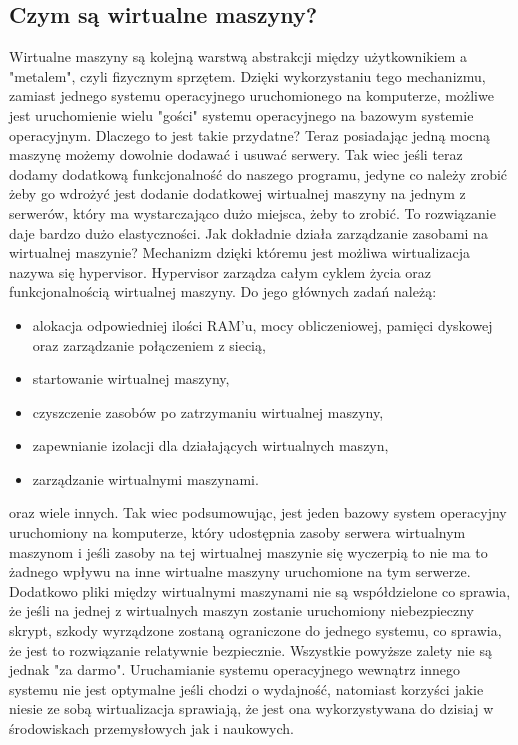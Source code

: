\subsection{Czym są wirtualne maszyny?}
Wirtualne maszyny są kolejną warstwą abstrakcji między użytkownikiem a "metalem", czyli fizycznym sprzętem. Dzięki wykorzystaniu tego mechanizmu, zamiast jednego systemu operacyjnego uruchomionego na komputerze, możliwe jest uruchomienie wielu "gości" systemu operacyjnego na bazowym systemie operacyjnym. Dlaczego to jest takie przydatne? Teraz posiadając jedną mocną maszynę możemy dowolnie dodawać i usuwać serwery. Tak wiec jeśli  teraz dodamy dodatkową funkcjonalność do naszego programu, jedyne co należy zrobić żeby go wdrożyć jest dodanie dodatkowej wirtualnej maszyny na jednym z serwerów, który ma wystarczająco dużo miejsca, żeby to zrobić. To rozwiązanie daje bardzo dużo elastyczności. 
Jak dokładnie działa zarządzanie zasobami na wirtualnej maszynie?
Mechanizm dzięki któremu jest możliwa wirtualizacja nazywa się hypervisor. Hypervisor zarządza całym cyklem życia oraz funkcjonalnością wirtualnej maszyny. 
Do jego głównych zadań należą:
\begin{itemize}
    \item alokacja odpowiedniej ilości RAM'u, mocy obliczeniowej, pamięci dyskowej oraz zarządzanie połączeniem z siecią,
    \item startowanie wirtualnej maszyny,
    \item czyszczenie zasobów po zatrzymaniu wirtualnej maszyny,
    \item zapewnianie izolacji dla działających wirtualnych maszyn,
    \item zarządzanie wirtualnymi maszynami.
\end{itemize}
oraz wiele innych. 
Tak wiec podsumowując, jest jeden bazowy system operacyjny uruchomiony na komputerze, który udostępnia zasoby serwera wirtualnym maszynom i jeśli zasoby na tej wirtualnej maszynie się wyczerpią to nie ma to żadnego wpływu na inne wirtualne maszyny uruchomione na tym serwerze. Dodatkowo pliki między wirtualnymi maszynami nie są współdzielone co sprawia, że jeśli na jednej z wirtualnych maszyn zostanie uruchomiony niebezpieczny skrypt, szkody wyrządzone zostaną ograniczone do jednego systemu, co sprawia, że jest to rozwiązanie relatywnie bezpiecznie.
Wszystkie powyższe zalety nie są jednak "za darmo". Uruchamianie systemu operacyjnego wewnątrz innego systemu nie jest optymalne jeśli chodzi o wydajność, natomiast korzyści jakie niesie ze sobą wirtualizacja sprawiają, że jest ona wykorzystywana do dzisiaj w środowiskach przemysłowych jak i naukowych. 
